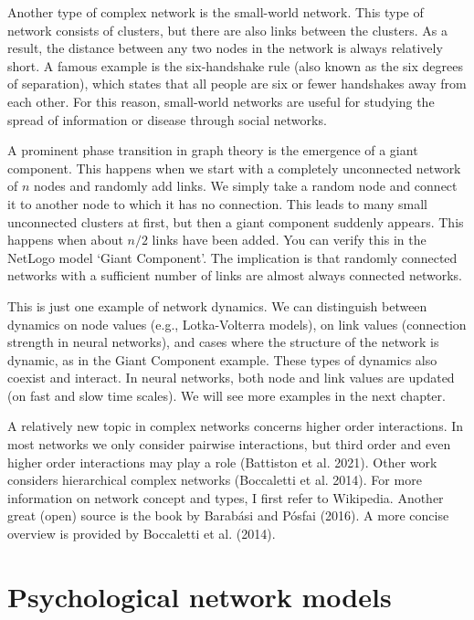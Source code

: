 \documentclass[
  letterpaper,
]{scrbook}
\begin{document}
Another type of complex network is the small-world network. This type of
network consists of clusters, but there are also links between the
clusters. As a result, the distance between any two nodes in the network
is always relatively short. A famous example is the six-handshake rule
(also known as the six degrees of separation), which states that all
people are six or fewer handshakes away from each other. For this
reason, small-world networks are useful for studying the spread of
information or disease through social networks.

A prominent phase transition in graph theory is the emergence of a giant
component. This happens when we start with a completely unconnected
network of \(n\) nodes and randomly add links. We simply take a random
node and connect it to another node to which it has no connection. This
leads to many small unconnected clusters at first, but then a giant
component suddenly appears. This happens when about \(n/2\) links have
been added. You can verify this in the NetLogo model `Giant Component'.
The implication is that randomly connected networks with a sufficient
number of links are almost always connected networks.

This is just one example of network dynamics. We can distinguish between
dynamics on node values (e.g., Lotka-Volterra models), on link values
(connection strength in neural networks), and cases where the structure
of the network is dynamic, as in the Giant Component example. These
types of dynamics also coexist and interact. In neural networks, both
node and link values are updated (on fast and slow time scales). We will
see more examples in the next chapter.

A relatively new topic in complex networks concerns higher order
interactions. In most networks we only consider pairwise interactions,
but third order and even higher order interactions may play a role
(Battiston et al. 2021). Other work considers hierarchical complex
networks (Boccaletti et al. 2014). For more information on network
concept and types, I first refer to Wikipedia. Another great (open)
source is the book by Barabási and Pósfai (2016). A more concise
overview is provided by Boccaletti et al. (2014).

\hypertarget{psychological-network-models-1}{%
\section{Psychological network
models}\label{psychological-network-models-1}}
\end{document}
